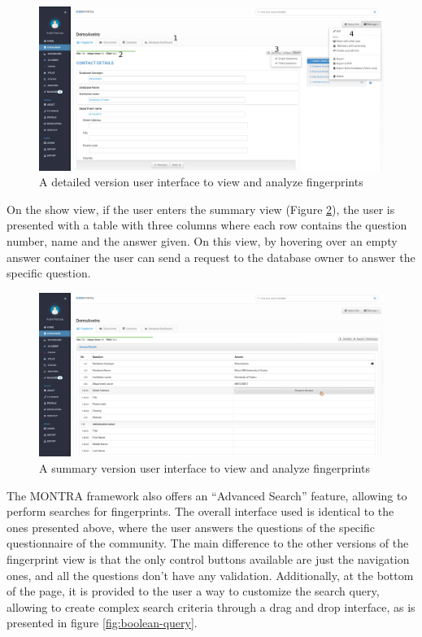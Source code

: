 \begin{figure}[H]
    \center
    \includegraphics[width=\textwidth]{fingerprint-show-detailed}
    \caption{A detailed version user interface to view and analyze fingerprints}
    \label{fig:fingerprint-show-detailed}
\end{figure}

On the show view, if the user enters the summary view (Figure \ref{fig:fingerprint-show-summary}), the user is presented with a table with three columns where each row contains the question number, name and the answer given.
On this view, by hovering over an empty answer container the user can send a request to the database owner to answer the specific question.

\begin{figure}
    \center
    \includegraphics[width=\textwidth]{fingerprint-show-summary}
    \caption{A summary version user interface to view and analyze fingerprints}
    \label{fig:fingerprint-show-summary}
\end{figure}

The MONTRA framework also offers an ``Advanced Search'' feature, allowing to perform searches for fingerprints.
The overall interface used is identical to the ones presented above, where the user answers the questions of the specific questionnaire of the community.
The main difference to the other versions of the fingerprint view is that the only control buttons available are just the navigation ones, and all the questions don't have any validation.
Additionally, at the bottom of the page, it is provided to the user a way to customize the search query, allowing to create complex search criteria through a drag and drop interface, as is presented in figure \ref{fig:boolean-query}.

